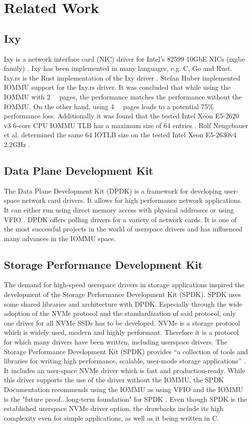 \chapter{Related Work}

\section{Ixy}
Ixy is a network interface card (NIC) driver for Intel's 82599 10GbE NICs (ixgbe family) \cite{emmerich2019user}.
Ixy has been implemented in many languages, e.g. C, Go and Rust. Ixy.rs is the Rust implementation of the Ixy driver \cite{baellmann}.
Stefan Huber implemented IOMMU support for the Ixy.rs driver. It was concluded that while using the IOMMU with \qty{2}{\mebi\byte} pages, the performance matches the performance without the IOMMU. On the other hand, using \qty{4}{\kibi\byte} pages leads to a potential 75\% performance loss. Additionally it was found that the tested Intel Xeon E5-2620 v3 6-core CPU IOMMU TLB has a maximum size of 64 entries \cite{iommuhuber}. Rolf Neugebauer et al. determined the same 64 IOTLB size on the tested Intel Xeon E5-2630v4 2.2GHz \cite{pcieperfnegebauer}.

\section{Data Plane Development Kit}
The Data Plane Development Kit (DPDK) is a framework for developing user-space network card drivers. It allows for high performance network applications. It can either run using direct memory access with physical addresses or using VFIO \cite{aboutdpdk}. DPDK offers polling drivers for a variety of network cards.
It is one of the most successful projects in the world of userspace drivers and has influenced many advances in the IOMMU space.

\section{Storage Performance Development Kit}
The demand for high-speed userspace drivers in storage applications inspired the development of the Storage Performance Development Kit (SPDK). SPDK uses some shared libraries and architecture with DPDK. Especially through the wide adoption of the NVMe protocol and the standardization of said protocol, only one driver for all NVMe SSDs has to be developed.
NVMe is a storage protocol which is widely used, modern and highly performant. Therefore it is a protocol for which many drivers have been written, including userspace drivers. The Storage Performance Development Kit (SPDK) provides ``a collection of tools and libraries for writing high performance, scalable, user-mode storage applications'' \cite{spdkindex}. It includes an user-space NVMe driver which is fast and production-ready. While this driver supports the use of the driver without the IOMMU, the SPDK Documentation recommends using the IOMMU as using VFIO and the IOMMU is the "future proof...long-term foundation" for SPDK \cite{spdkmemory}. Even though SPDK is the established userspace NVMe driver option, the drawbacks include its high complexity even for simple applications, as well as it being written in C.
